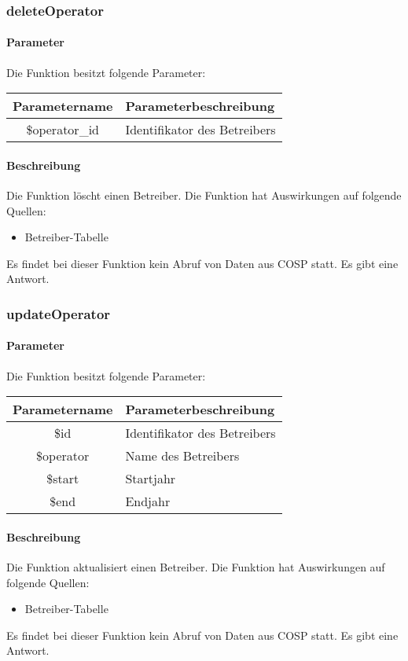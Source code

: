 \subsubsection{deleteOperator}
\paragraph{Parameter} Die Funktion besitzt folgende Parameter:
\begin{table}[H]
	\begin{tabular}{|c|p{11cm}|}
		\hline
		\textbf{Parametername} & \textbf{Parameterbeschreibung} \\ \hline
		\$operator\_id  & Identifikator des Betreibers \\ \hline
	\end{tabular}
\end{table}
\paragraph{Beschreibung} Die Funktion löscht einen Betreiber. Die Funktion hat Auswirkungen auf folgende Quellen:
\begin{itemize}
	\item Betreiber-Tabelle
\end{itemize}
Es findet bei dieser Funktion kein Abruf von Daten aus {\glqq COSP\grqq} statt. Es gibt eine Antwort.
\subsubsection{updateOperator}
\paragraph{Parameter} Die Funktion besitzt folgende Parameter:
\begin{table}[H]
	\begin{tabular}{|c|p{11cm}|}
		\hline
		\textbf{Parametername} & \textbf{Parameterbeschreibung} \\ \hline
		\$id       & Identifikator des Betreibers \\ \hline
		\$operator & Name des Betreibers \\ \hline
		\$start    & Startjahr \\ \hline
		\$end      & Endjahr \\ \hline
	\end{tabular}
\end{table}
\paragraph{Beschreibung} Die Funktion aktualisiert einen Betreiber. Die Funktion hat Auswirkungen auf folgende Quellen:
\begin{itemize}
	\item Betreiber-Tabelle
\end{itemize}
Es findet bei dieser Funktion kein Abruf von Daten aus {\glqq COSP\grqq} statt. Es gibt eine Antwort.
